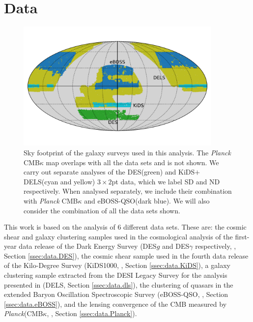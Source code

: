 \documentclass[a4paper,11pt]{article}
\newcommand{\cmbk}{CMB$\kappa$\xspace}
\newcommand{\des}{DES\xspace}
\newcommand{\kids}{KiDS\xspace}
\newcommand{\planck}{{\sl Planck}\xspace}
\newcommand{\eboss}{eBOSS-QSO\xspace}
\newcommand{\dls}{DELS\xspace}
\newcommand{\northd}{ND\xspace}
\newcommand{\southd}{SD\xspace}
\begin{document}
  \section{Data}\label{sec:data}
    \begin{figure}
      \centering
      \includegraphics[width=0.9\textwidth]{figures/footprint2.pdf}
      \caption{Sky footprint of the galaxy surveys used in this analysis. The \planck \cmbk map overlaps with all the data sets and is not shown. We carry out separate analyses of the \des (green) and \kids$+$\dls (cyan and yellow) $3\times2$pt data, which we label \southd and \northd respectively. When analysed separately, we include their combination with \planck \cmbk and \eboss (dark blue). We will also consider the combination of all the data sets shown.}
      \label{fig:footprint}
    \end{figure}
    This work is based on the analysis of 6 different data sets. These are: the cosmic shear and galaxy clustering samples used in the cosmological analysis of the first-year data release of the Dark Energy Survey (DES$g$ and DES$\gamma$ respectively, \cite{1708.01530}, Section \ref{ssec:data.DES}), the cosmic shear sample used in the fourth data release of the Kilo-Degree Survey (KiDS1000, \cite{2007.15633}, Section \ref{ssec:data.KiDS}), a galaxy clustering sample extracted from the DESI Legacy Survey for the analysis presented in \cite{2010.00466} (\dls, Section \ref{ssec:data.dls}),  the clustering of quasars in the extended Baryon Oscillation Spectroscopic Survey (\eboss, \cite{2007.08999}, Section \ref{ssec:data.eBOSS}), and the lensing convergence of the CMB measured by \planck (\cmbk, \citep{1807.06210}, Section \ref{ssec:data.Planck}).
\end{document}
